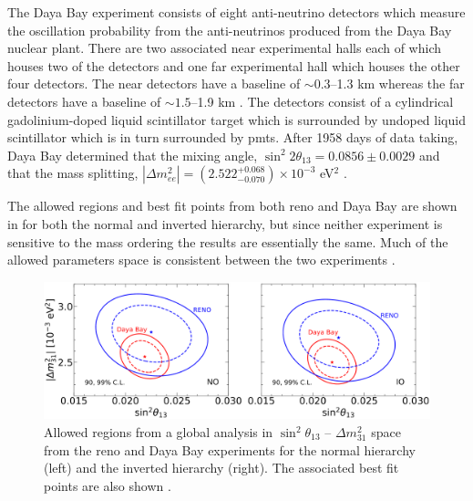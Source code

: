 The Daya Bay experiment consists of eight anti-neutrino detectors which measure the oscillation probability from the anti-neutrinos produced from the Daya Bay nuclear plant. There are two associated near experimental halls each of which houses two of the detectors and one far experimental hall which houses the other four detectors. The near detectors have a baseline of $\sim0.3$--1.3 km whereas the far detectors have a baseline of $\sim1.5$--1.9 km \cite{2020_global_reassessment_of_the_neutrino_oscillation_picture}. The detectors consist of a cylindrical gadolinium-doped liquid scintillator target which is surrounded by undoped liquid scintillator which is in turn surrounded by \glspl{pmt}. After 1958 days of data taking, Daya Bay determined that the mixing angle, $\sin^2{2\theta_{13}} = 0.0856 \pm 0.0029$ and that the mass splitting, $|\Delta m^2_{ee}| = (2.522^{+0.068}_{-0.070}) \times 10^{-3}$ eV$^2$ \cite{Measurement_of_electron_antineutrino_oscillation_with_1958_days_of_operation_at_Daya_Bay}.

The allowed regions and best fit points from both \gls{reno} and Daya Bay are shown in  for both the normal and inverted hierarchy, but since neither experiment is sensitive to the mass ordering the results are essentially the same. Much of the allowed parameters space is consistent between the two experiments \cite{2020_global_reassessment_of_the_neutrino_oscillation_picture}.

\begin{figure}
    \centering
    \includegraphics[width = \hugefigwidth]{figures-chap2/theta_13.png}
    \caption[Allowed regions in $\sin^2{\theta_{13}}$ -- $\Delta m^2_{31}$ space from the \gls{reno} and Daya Bay experiments.]{Allowed regions from a global analysis in $\sin^2{\theta_{13}}$ -- $\Delta m^2_{31}$ space from the \gls{reno} and Daya Bay experiments for the normal hierarchy (left) and the inverted hierarchy (right). The associated best fit points are also shown
    \cite{2020_global_reassessment_of_the_neutrino_oscillation_picture}.}
    \label{fig:Reno_Daya_Bay}
\end{figure}

